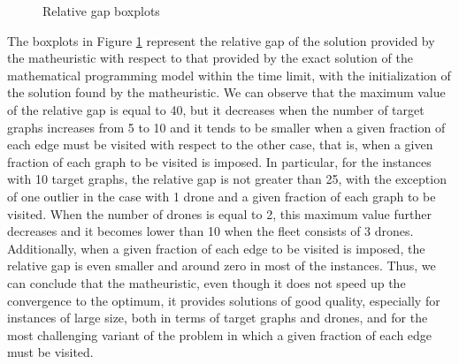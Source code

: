 \documentclass[10pt,a4paper]{elsarticle}
\newcommand{\EN}[1]{{\color{black}#1}}
\begin{document}
\begin{figure}[h!]
	\caption{Relative gap boxplots}
	\label{fig:gap_boxplot}
\end{figure}
\noindent
The boxplots in Figure \ref{fig:gap_boxplot} represent the relative gap of the solution provided by the matheuristic with respect to \EN{that} provided by the exact solution of the mathematical programming model within the time limit, with the initialization of the solution found by the matheuristic. We can observe that the maximum value of the relative gap is equal to 40, but it decreases when the number of target graphs increases from 5 to 10 and it tends to be smaller when a given fraction of each edge must be visited with respect to the other case, that is, when a given fraction of each graph to be visited is imposed. In particular, for the instances with 10 target graphs, the relative gap is not greater than 25, with the exception of one outlier in the case with 1 drone and a given fraction of each graph to be visited. When the number of drones is equal to 2, this maximum value further decreases and it becomes lower than 10 when the fleet consists of 3 drones. Additionally, when a given fraction of each edge to be visited is imposed, the relative gap is even smaller and around zero in most of the instances. Thus, we can conclude that the matheuristic, even \EN{though} it does not speed up the convergence to the optimum, it provides solutions of good quality, especially for instances of large size, both in terms of target graphs and drones, and for the most challenging variant of the problem in which a given fraction of each edge must be visited.
\end{document}

